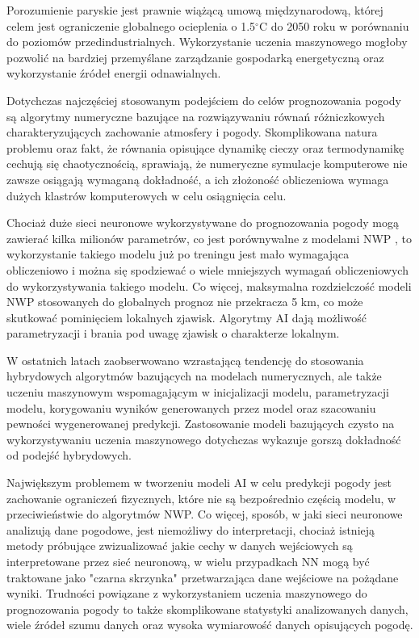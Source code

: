 Porozumienie paryskie jest prawnie wiążącą umową międzynarodową,
której celem jest ograniczenie globalnego ocieplenia o 1.5$^{\circ}$C
do 2050 roku w porównaniu do poziomów przedindustrialnych. Wykorzystanie
uczenia maszynowego mogłoby pozwolić na bardziej przemyślane zarządzanie
gospodarką energetyczną oraz wykorzystanie źródeł energii odnawialnych.

Dotychczas najczęściej stosowanym podejściem do celów prognozowania
pogody są algorytmy numeryczne bazujące na rozwiązywaniu równań różniczkowych
charakteryzujących zachowanie atmosfery i pogody. Skomplikowana natura
problemu oraz fakt, że równania opisujące dynamikę cieczy oraz termodynamikę
cechują się chaotycznością, sprawiają, że numeryczne symulacje komputerowe
nie zawsze osiągają wymaganą dokładność, a ich złożoność obliczeniowa
wymaga dużych klastrów komputerowych w celu osiągnięcia celu.

Chociaż duże sieci neuronowe wykorzystywane do prognozowania pogody
mogą zawierać kilka milionów parametrów, co jest porównywalne z modelami
NWP \cite{can-dl-beat-numerical}, to wykorzystanie takiego modelu już po treningu
jest mało wymagająca obliczeniowo i można się spodziewać o wiele mniejszych wymagań
obliczeniowych do wykorzystywania takiego modelu. Co więcej, maksymalna rozdzielczość
modeli NWP stosowanych do globalnych prognoz nie przekracza 5 km, 
co może skutkować pominięciem lokalnych zjawisk. Algorytmy AI dają możliwość
parametryzacji i brania pod uwagę zjawisk o charakterze lokalnym.

W ostatnich latach zaobserwowano wzrastającą tendencję do stosowania hybrydowych
algorytmów bazujących na modelach numerycznych, ale także uczeniu maszynowym
wspomagającym w inicjalizacji modelu, parametryzacji modelu, korygowaniu
wyników generowanych przez model oraz szacowaniu pewności wygenerowanej
predykcji. Zastosowanie modeli bazujących czysto na wykorzystywaniu uczenia
maszynowego dotychczas wykazuje gorszą dokładność od podejść hybrydowych.

Największym problemem w tworzeniu modeli AI w celu predykcji pogody jest
zachowanie ograniczeń fizycznych, które nie są bezpośrednio częścią modelu,
w przeciwieństwie do algorytmów NWP. Co więcej, sposób, w jaki sieci neuronowe
analizują dane pogodowe, jest niemożliwy do interpretacji, chociaż istnieją
metody próbujące zwizualizować jakie cechy w danych wejściowych są interpretowane
przez sieć neuronową, w wielu przypadkach NN mogą być traktowane jako "czarna 
skrzynka" przetwarzająca dane wejściowe na pożądane wyniki. Trudności powiązane
z wykorzystaniem uczenia maszynowego do prognozowania pogody to także skomplikowane
statystyki analizowanych danych, wiele źródeł szumu danych oraz wysoka wymiarowość
danych opisujących pogodę.

